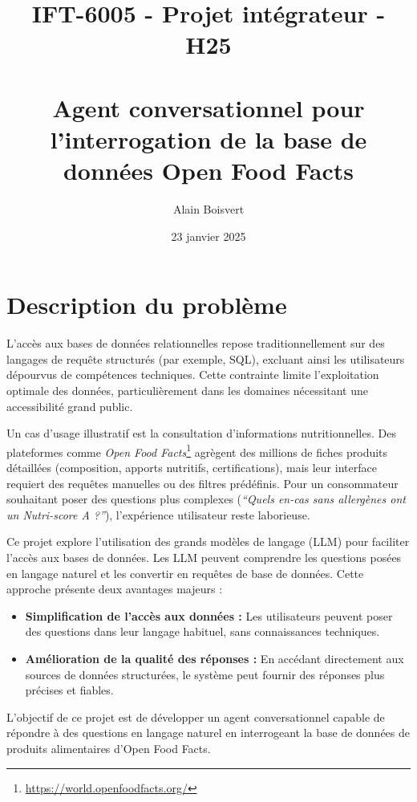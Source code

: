 \documentclass[a4paper,11pt]{article}
\title{IFT-6005 - Projet intégrateur - H25 \\ ~ \\ Agent conversationnel pour l'interrogation de la base de données Open Food Facts}
\author{Alain Boisvert}
\date{23 janvier 2025}
\begin{document}

\newpage

\tableofcontents
\newpage

\section{Description du problème}  
\label{sec:probleme}

L'accès aux bases de données relationnelles repose traditionnellement sur des langages de requête structurés (par exemple, SQL),
excluant ainsi les utilisateurs dépourvus de compétences techniques. Cette contrainte limite l'exploitation optimale des
données, particulièrement dans les domaines nécessitant une accessibilité grand public.

Un cas d'usage illustratif est la consultation d'informations nutritionnelles. Des plateformes comme \textit{Open Food Facts}\footnote{\url{https://world.openfoodfacts.org/}}
agrègent des millions de fiches produits détaillées (composition, apports nutritifs, certifications), mais leur
interface requiert des requêtes manuelles ou des filtres prédéfinis. Pour un consommateur souhaitant poser des questions
plus complexes (\textit{\enquote{Quels en-cas sans allergènes ont un Nutri-score A ?}}), l'expérience utilisateur reste laborieuse.

Ce projet explore l'utilisation des grands modèles de langage (LLM) pour faciliter l'accès aux bases de données.
Les LLM peuvent comprendre les questions posées en langage naturel et les convertir en requêtes de base de données. Cette approche présente deux avantages majeurs :


\begin{itemize}
\item \textbf{Simplification de l'accès aux données :} Les utilisateurs peuvent poser des questions dans leur langage habituel, sans connaissances techniques.
\item \textbf{Amélioration de la qualité des réponses :} En accédant directement aux sources de données structurées, le système peut fournir des réponses plus précises et fiables.
\end{itemize}

L'objectif de ce projet est de développer un agent conversationnel capable de répondre à des questions en langage naturel en interrogeant la base de données de produits alimentaires
d'Open Food Facts.
\end{document}

